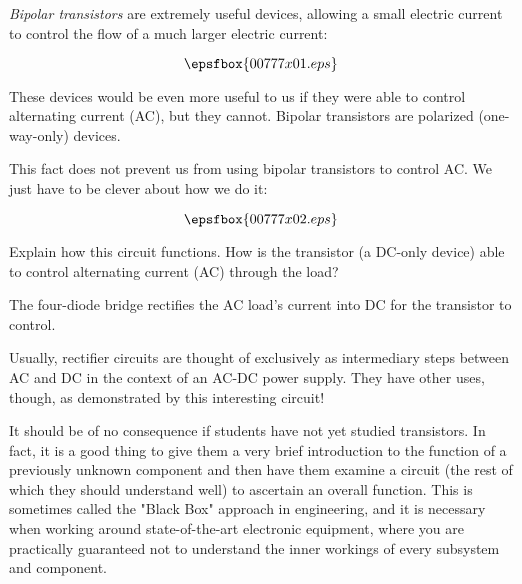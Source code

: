 

{\it Bipolar transistors} are extremely useful devices, allowing a small electric current to control the flow of a much larger electric current:

$$\epsfbox{00777x01.eps}$$

These devices would be even more useful to us if they were able to control alternating current (AC), but they cannot.  Bipolar transistors are polarized (one-way-only) devices.

This fact does not prevent us from using bipolar transistors to control AC.  We just have to be clever about how we do it:

$$\epsfbox{00777x02.eps}$$

Explain how this circuit functions.  How is the transistor (a DC-only device) able to control alternating current (AC) through the load?







The four-diode bridge rectifies the AC load's current into DC for the transistor to control.







Usually, rectifier circuits are thought of exclusively as intermediary steps between AC and DC in the context of an AC-DC power supply.  They have other uses, though, as demonstrated by this interesting circuit!

It should be of no consequence if students have not yet studied transistors.  In fact, it is a good thing to give them a very brief introduction to the function of a previously unknown component and then have them examine a circuit (the rest of which they should understand well) to ascertain an overall function.  This is sometimes called the "Black Box" approach in engineering, and it is necessary when working around state-of-the-art electronic equipment, where you are practically guaranteed not to understand the inner workings of every subsystem and component.




